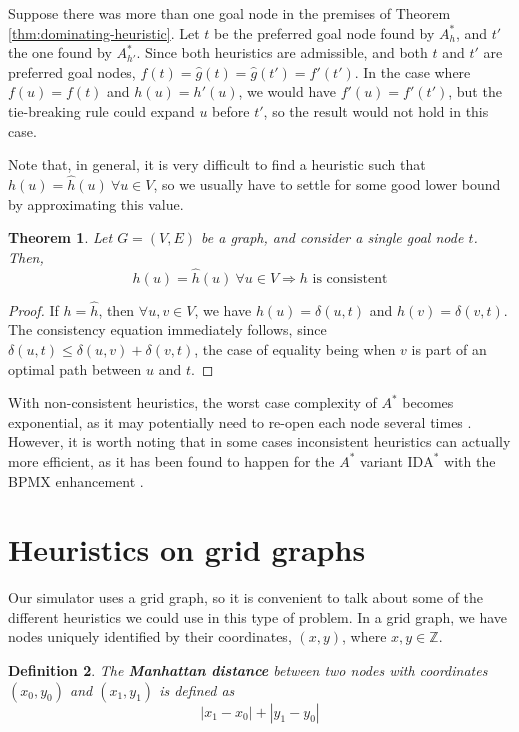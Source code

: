 \documentclass[a4paper,10pt]{report}
\newtheorem{theorem}{Theorem}[chapter]
\newtheorem{definition}[theorem]{Definition}
\begin{document}
Suppose there was more than one goal node in the premises of Theorem \ref{thm:dominating-heuristic}. Let $t$ be the preferred goal node found by $A^*_h$, and $t'$ the one found by $A^*_{h'}$. Since both heuristics are admissible, and both $t$ and $t'$ are preferred goal nodes, $f(t) = \hat{g}(t) = \hat{g}(t') = f'(t')$. In the case where $f(u) = f(t)$ and $h(u) = h'(u)$, we would have $f'(u) = f'(t')$, but the tie-breaking rule could expand $u$ before $t'$, so the result would not hold in this case.

Note that, in general, it is very difficult to find a heuristic such that $h(u) = \hat{h}(u) \  \forall u \in V$, so we usually have to settle for some good lower bound by approximating this value.

\begin{theorem}
\label{thm:exact-heuristics-consistency}
Let $G = (V, E)$ be a graph, and consider a single goal node $t$. Then,
\[ h(u) = \hat{h}(u) \  \forall u \in V \Rightarrow h \text{ is consistent} \]
\end{theorem}
\begin{proof}
If $h = \hat{h}$, then $\forall u, v \in V$, we have $h(u) = \delta(u, t)$ and $h(v) = \delta(v, t)$.
The consistency equation immediately follows, since $\delta(u, t) \leq \delta(u, v) + \delta(v, t)$, the case of equality being when $v$ is part of an optimal path between $u$ and $t$.
\end{proof}

With non-consistent heuristics, the worst case complexity of $A^*$ becomes exponential, as it may potentially need to re-open each node several times \cite{martelli}. However, it is worth noting that in some cases inconsistent heuristics can actually more efficient, as it has been found to happen for the $A^*$ variant $\text{IDA}^*$ with the BPMX enhancement \cite{inconsistent}.

\section{Heuristics on grid graphs}
\label{section:heuristics-grid}
Our simulator uses a grid graph, so it is convenient to talk about some of the different heuristics we could use in this type of problem. In a grid graph, we have nodes uniquely identified by their coordinates, $(x, y)$, where $x,y \in \mathbb{Z}$.

\begin{definition}
\label{def:manhattan}
The \textbf{Manhattan distance} between two nodes with coordinates $(x_0, y_0)$ and $(x_1, y_1)$ is defined as
\begin{equation}
|x_1 - x_0| + |y_1 - y_0|
\end{equation}
\end{definition}
\end{document}
